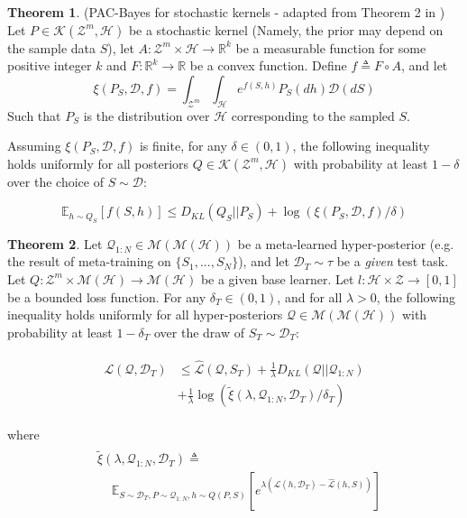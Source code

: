 \documentclass[letterpaper]{article} %
\theoremstyle{definition}
\newtheorem{theorem}{Theorem}[section]
\newcommand{\Expect}[2]{\mathbb{E}_{#1}\left [#2 \right ]}
\begin{document}
\begin{theorem} (PAC-Bayes for stochastic kernels - adapted from Theorem 2 in \citet{Rivasplata2020}) \label{thm:rivasplata-pb-appendix}
	Let $P\in \mathcal{K}(\mathcal{Z}^m, \mathcal{H})$ be a stochastic kernel (Namely, the prior may depend on the sample data $S$), let $A: \mathcal{Z}^m\times \mathcal{H}\rightarrow \mathbb{R}^k$ be a measurable function for some positive integer $k$ and $F:\mathbb{R}^k\rightarrow \mathbb{R}$ be a convex function.
	Define $f\triangleq F\circ A$, and let 
	$$\xi(P_S, \mathcal{D}, f)=\int_{\mathcal{Z}^m}\int_{\mathcal{H}}e^{f(S, h)}P_S(dh)\mathcal{D}(dS)$$
	Such that $P_S$ is the distribution over $\mathcal{H}$ corresponding to the sampled $S$.
	
	Assuming $\xi(P_S, \mathcal{D}, f)$ is finite, for any $\delta \in (0,1)$, the following inequality holds uniformly for all posteriors $Q\in \mathcal{K}(\mathcal{Z}^m, \mathcal{H})$ with probability at least $1-\delta$ over the choice of $S\sim \mathcal{D}$:
	
	\begin{equation} \label{eq:ribasplata-pb-appendix}
	\Expect{h\sim Q_S}{f(S, h)} \leq D_{KL}(Q_S||P_S)+\log\left (\xi(P_S, \mathcal{D}, f)/\delta\right )
	\end{equation}
\end{theorem}

\begin{theorem}
	Let $\mathcal{Q}_{1:N}\in \mathcal{M}(\mathcal{M}(\mathcal{H}))$ be a meta-learned hyper-posterior (e.g. the result of meta-training on $\{S_1,...,S_N\}$), and let $\mathcal{D}_T\sim \tau$ be a \emph{given} test task. Let $Q: \mathcal{Z}^m\times\mathcal{M}(\mathcal{H})\rightarrow \mathcal{M}(\mathcal{H})$ be a given base learner. Let $l: \mathcal{H}\times \mathcal{Z}\rightarrow [0, 1]$ be a bounded loss function.
	For any $\delta_T \in (0,1)$, and for all $\lambda>0$, the following inequality holds uniformly for all hyper-posteriors $\mathcal{Q}\in \mathcal{M}(\mathcal{M}(\mathcal{H}))$ with probability at least $1-\delta_T$ over the draw of $S_T\sim \mathcal{D}_T$:
	
	\begin{align}
	\begin{split}
	\mathcal{L}(\mathcal{Q}, \mathcal{D}_T) &\leq \hat{\mathcal{L}}(\mathcal{Q}, S_T) + \frac{1}{\lambda}D_{KL}(\mathcal{Q}||\mathcal{Q}_{1:N})\\
	&+\frac{1}{\lambda}\log\left (\tilde{\xi}(\lambda,\mathcal{Q}_{1:N},\mathcal{D}_T)/\delta_T\right )
	\end{split}
	\end{align}
	
	
	where 
	\begin{align} \label{eq:tilde_xi}
	\begin{split}
	&\tilde{\xi}(\lambda,\mathcal{Q}_{1:N},\mathcal{D}_T)\triangleq \\
	&\;\;\;\; \Expect{S\sim \mathcal{D}_T, P\sim \mathcal{Q}_{1:N}, h\sim Q(P,S)}{e^{\lambda\left (\mathcal{L}(h, \mathcal{D}_T)-\hat{\mathcal{L}}(h, S)\right )}}
	\end{split}
	\end{align}
\end{theorem}
\end{document}
